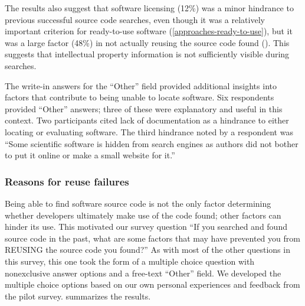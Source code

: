 \documentclass{casicswhitepaper}
\begin{document}
The results also suggest that software licensing (12\%) was a minor hindrance to previous successful source code searches, even though it was a relatively important criterion for ready-to-use software (\ref{approaches-ready-to-use}), but it was a large factor (48\%) in not actually reusing the source code found (). This suggests that intellectual property information is not sufficiently visible during searches.

%

The write-in answers for the ``Other'' field provided additional insights into factors that contribute to being unable to locate software.  Six respondents provided ``Other'' answers; three of these were explanatory and useful in this context.  Two participants cited lack of documentation as a hindrance to either locating or evaluating software.  The third hindrance noted by a respondent was ``Some scientific software is hidden from search engines as authors did not bother to put it online or make a small website for it.''


\subsubsection{Reasons for reuse failures}
\label{reuse-failures}

Being able to find software source code is not the only factor determining whether developers ultimately make use of the code found; other factors can hinder its use.  This motivated our survey question ``If you searched and found source code in the past, what are some factors that may have prevented you from REUSING the source code you found?''  As with most of the other questions in this survey, this one took the form of a multiple choice question with nonexclusive answer options and a free-text ``Other'' field.  We developed the multiple choice options based on our own personal experiences and feedback from the pilot survey.   summarizes the results.
\end{document}
